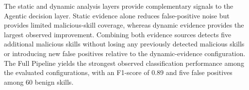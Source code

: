 \begin{tcolorbox}[
    colback=gray!5,
    colframe=gray!75!black,
    title=\textbf{Key Findings for RQ2}
]


The static and dynamic analysis layers provide
complementary signals to the Agentic decision layer.
Static evidence alone reduces false-positive noise
but provides limited malicious-skill coverage,
whereas dynamic evidence provides the largest
observed improvement.
Combining both evidence sources detects five
additional malicious skills without losing any
previously detected malicious skills or introducing
new false positives relative to the dynamic-evidence
configuration.
The Full Pipeline yields the strongest observed
classification performance among the evaluated
configurations, with an F1-score of 0.89 and five
false positives among 60 benign skills.
\end{tcolorbox}